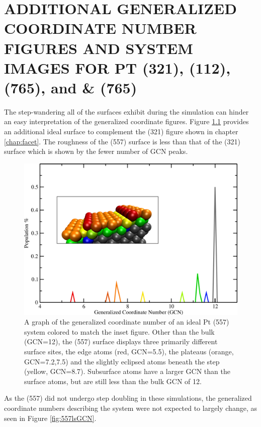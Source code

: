 
\chapter{ADDITIONAL GENERALIZED COORDINATE NUMBER FIGURES AND SYSTEM IMAGES FOR PT (321), (112), (765), and \& (765)}
\label{app:SI2}

The step-wandering all of the surfaces exhibit during the simulation can hinder
an easy interpretation of the generalized coordinate figures. Figure
\ref{fig:557GCN} provides an additional ideal surface to complement the (321)
figure shown in chapter \ref{chap:facet}. The roughness of the (557) surface is
less than that of the (321) surface which is shown by the fewer number of GCN
peaks. 

\begin{figure}
\includegraphics[width=\linewidth]{../figures/appB/557_ideal_gcn.pdf}
\caption{A graph of the generalized coordinate number of an ideal Pt (557)
system colored to match the inset figure. Other than the bulk (GCN=12), the
(557) surface displays three primarily different surface sites, the edge atoms
(red, GCN=5.5), the plateaus (orange, GCN=7.2,7.5) and the slightly eclipsed
atoms beneath the step (yellow, GCN=8.7). Subsurface atoms have a larger GCN
than the surface atoms, but are still less than the bulk GCN of 12.}
\label{fig:557GCN}
\end{figure}
\newpage


As the  (557) did not undergo step doubling in these simulations, the
generalized coordinate numbers describing the system were not expected to
largely change, as seen in Figure \ref{fig:557lsGCN}.


